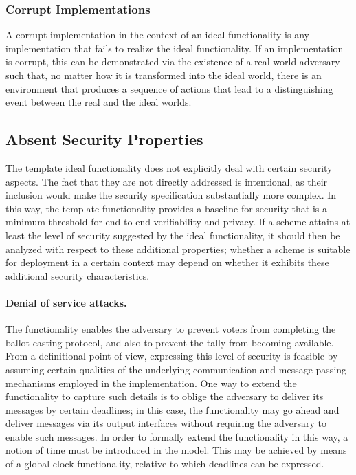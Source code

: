 \subsubsection{Corrupt Implementations} 

A corrupt implementation in the context of an ideal functionality is
any implementation that fails to realize the ideal functionality. If
an implementation is corrupt, this can be demonstrated via the
existence of a real world adversary such that, no matter how it is
transformed into the ideal world, there is an environment that
produces a sequence of actions that lead to a distinguishing event
between the real and the ideal worlds.

\subsection{Absent Security Properties}

The template ideal functionality does not explicitly deal with certain
security aspects. The fact that they are not directly addressed is
intentional, as their inclusion would make the security specification
substantially more complex. In this way, the template functionality
provides a baseline for security that is a minimum threshold for
end-to-end verifiability and privacy. If a scheme attains at least the
level of security suggested by the ideal functionality, it should then
be analyzed with respect to these additional properties; whether a
scheme is suitable for deployment in a certain context may depend on
whether it exhibits these additional security characteristics.

\paragraph{Denial of service attacks.} The functionality enables the
adversary to prevent voters from completing the ballot-casting
protocol, and also to prevent the tally from becoming available. From
a definitional point of view, expressing this level of security is
feasible by assuming certain qualities of the underlying communication
and message passing mechanisms employed in the implementation. One way
to extend the functionality to capture such details is to oblige the
adversary to deliver its messages by certain deadlines; in this case,
the functionality may go ahead and deliver messages via its output
interfaces without requiring the adversary to enable such messages. In
order to formally extend the functionality in this way, a notion of
time must be introduced in the model. This may be achieved by means of
a global clock functionality, relative to which deadlines can be
expressed.

